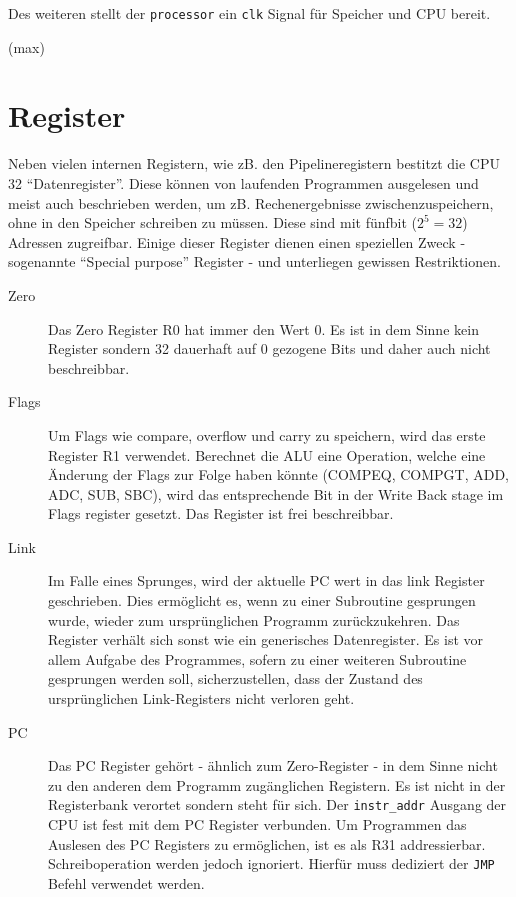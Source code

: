 \documentclass[paper=a4,fontsize=12pt,twocolumn]{scrreprt}
\begin{document}
Des weiteren stellt der \texttt{processor} ein \texttt{clk} Signal für Speicher und CPU bereit.

(max)

\section{Register}

Neben vielen internen Registern, wie zB. den Pipelineregistern bestitzt die CPU 32 \enquote{Datenregister}.
Diese können von laufenden Programmen ausgelesen und meist auch beschrieben werden, um zB. Rechenergebnisse zwischenzuspeichern, ohne in den Speicher schreiben zu müssen. 
Diese sind mit fünfbit ($2^5 = 32$) Adressen zugreifbar. 
Einige dieser Register dienen einen speziellen Zweck - sogenannte \enquote{Special purpose} Register - und unterliegen gewissen Restriktionen.
\begin{description}
    \item[Zero]
        Das Zero Register R0 hat immer den Wert $0$.
        Es ist in dem Sinne kein Register sondern 32 dauerhaft auf 0 gezogene Bits und daher auch nicht beschreibbar.
    \item[Flags]
        Um Flags wie compare, overflow und carry zu speichern, wird das erste Register R1 verwendet.
        Berechnet die ALU eine Operation, welche eine Änderung der Flags zur Folge haben könnte (COMPEQ, COMPGT, ADD, ADC, SUB, SBC), wird das entsprechende Bit in der Write Back stage im Flags register gesetzt.
        Das Register ist frei beschreibbar.
    \item[Link]
        Im Falle eines Sprunges, wird der aktuelle PC wert in das link Register geschrieben.
        Dies ermöglicht es, wenn zu einer Subroutine gesprungen wurde, wieder zum ursprünglichen Programm zurückzukehren.
        Das Register verhält sich sonst wie ein generisches Datenregister.
        Es ist vor allem Aufgabe des Programmes, sofern zu einer weiteren Subroutine gesprungen werden soll, sicherzustellen, dass der Zustand des ursprünglichen Link-Registers nicht verloren geht.
    \item[PC]
        Das PC Register gehört - ähnlich zum Zero-Register - in dem Sinne nicht zu den anderen dem Programm zugänglichen Registern.
        Es ist nicht in der Registerbank verortet sondern steht für sich.
        Der \texttt{instr\_addr} Ausgang der CPU ist fest mit dem PC Register verbunden.
        Um Programmen das Auslesen des PC Registers zu ermöglichen, ist es als R31 addressierbar. Schreiboperation werden jedoch ignoriert.
        Hierfür muss dediziert der \texttt{JMP} Befehl verwendet werden.
\end{description}
\end{document}
